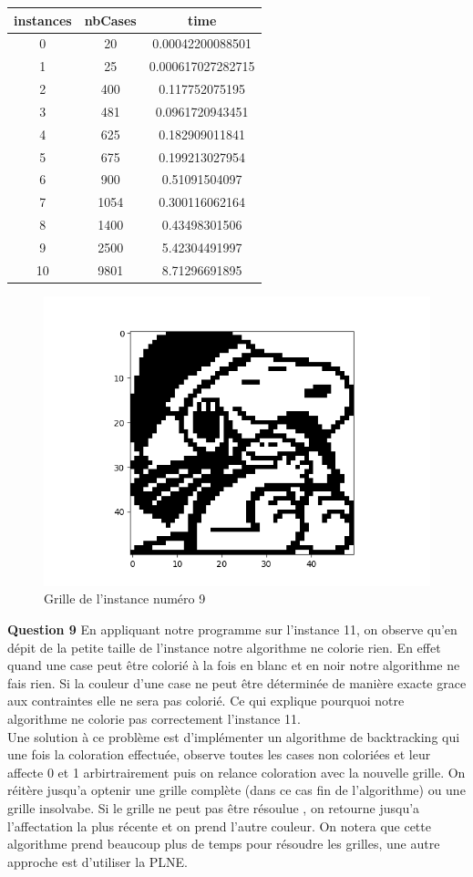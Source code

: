 \documentclass[a4paper]{memoir}
\begin{document}
        

\begin{tabular}{|c||c||c|}
\hline
instances & nbCases & time \\ 
\hline
0 & 20 & 0.00042200088501 \\ 
\hline
1 & 25 & 0.000617027282715 \\ 
\hline
2 & 400 & 0.117752075195 \\ 
\hline
3 & 481 & 0.0961720943451 \\ 
\hline
4 & 625 & 0.182909011841 \\ 
\hline
5 & 675 & 0.199213027954 \\ 
\hline
6 & 900 & 0.51091504097 \\ 
\hline
7 & 1054 & 0.300116062164 \\ 
\hline
8 & 1400 & 0.43498301506 \\ 
\hline
9 & 2500 & 5.42304491997 \\ 
\hline
10 & 9801 & 8.71296691895 \\ 
\hline
\end{tabular}


\begin{figure}[h]
  \centering
  \includegraphics[width=0.75\linewidth]{../images/dynamique_instance9.png}
  \caption{Grille de l'instance numéro 9}
  \label{fig:instance9}
\end{figure}

\textbf{Question 9} En appliquant notre programme sur l'instance 11, on observe qu'en dépit de la petite taille de l'instance notre algorithme ne colorie rien. En effet quand une case peut être colorié à la fois en blanc et en noir notre algorithme ne fais rien. Si la couleur d'une case ne peut être déterminée de manière exacte grace aux contraintes elle ne sera pas colorié. Ce qui explique pourquoi notre algorithme ne colorie pas correctement l'instance 11.
\\
Une solution à ce problème est d'implémenter un algorithme de backtracking qui une fois la coloration effectuée, observe toutes les cases non coloriées et leur affecte 0 et 1 arbirtrairement puis on relance coloration avec la nouvelle grille. On réitère jusqu'a optenir une grille complète (dans ce cas fin de l'algorithme) ou une grille insolvabe. Si le grille ne peut pas être résoulue , on retourne jusqu'a l'affectation la plus récente et on prend l'autre couleur. On notera que cette algorithme prend beaucoup plus de temps pour résoudre les grilles, une autre approche est d'utiliser la PLNE.
\end{document}
